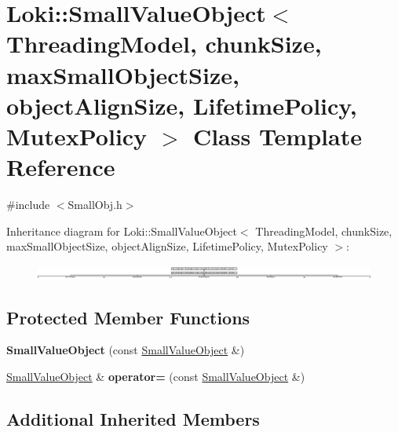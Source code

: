 \hypertarget{classLoki_1_1SmallValueObject}{}\section{Loki\+:\+:Small\+Value\+Object$<$ Threading\+Model, chunk\+Size, max\+Small\+Object\+Size, object\+Align\+Size, Lifetime\+Policy, Mutex\+Policy $>$ Class Template Reference}
\label{classLoki_1_1SmallValueObject}


{\ttfamily \#include $<$Small\+Obj.\+h$>$}

Inheritance diagram for Loki\+:\+:Small\+Value\+Object$<$ Threading\+Model, chunk\+Size, max\+Small\+Object\+Size, object\+Align\+Size, Lifetime\+Policy, Mutex\+Policy $>$\+:\begin{figure}[H]
\begin{center}
\leavevmode
\includegraphics[height=0.469930cm]{classLoki_1_1SmallValueObject}
\end{center}
\end{figure}
\subsection*{Protected Member Functions}
\begin{DoxyCompactItemize}
\item 
\hypertarget{classLoki_1_1SmallValueObject_ae446be83fd90d9369b557a90b2d6f4e5}{}{\bfseries Small\+Value\+Object} (const \hyperlink{classLoki_1_1SmallValueObject}{Small\+Value\+Object} \&)\label{classLoki_1_1SmallValueObject_ae446be83fd90d9369b557a90b2d6f4e5}

\item 
\hypertarget{classLoki_1_1SmallValueObject_a9cca2d34447dd4ebc4a885cb04f113e4}{}\hyperlink{classLoki_1_1SmallValueObject}{Small\+Value\+Object} \& {\bfseries operator=} (const \hyperlink{classLoki_1_1SmallValueObject}{Small\+Value\+Object} \&)\label{classLoki_1_1SmallValueObject_a9cca2d34447dd4ebc4a885cb04f113e4}

\end{DoxyCompactItemize}
\subsection*{Additional Inherited Members}


